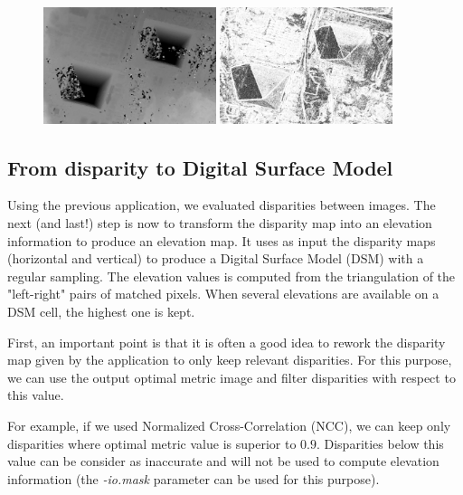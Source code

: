 \begin{figure}[!h]
  \center
  \includegraphics[width=0.45\textwidth]{../Art/MonteverdiImages/stereo_disparity_horizontal.png}
  \includegraphics[width=0.45\textwidth]{../Art/MonteverdiImages/stereo_disparity_metric.png}
  \label{fig:DisparityMetric}
\end{figure}

\subsection{From disparity to Digital Surface Model}

Using the previous application, we evaluated disparities between images. The
next (and last!) step is now to transform the disparity map into an elevation
information to produce an elevation map. It uses as input the disparity maps
(horizontal and vertical) to produce a Digital Surface Model (DSM) with a
regular sampling. The elevation values is computed from the triangulation of the
"left-right" pairs of matched pixels. When several elevations are available on
a DSM cell, the highest one is kept.

First, an important point is that it is often a good idea to rework
the disparity map given by the  application
to only keep relevant disparities. For this purpose, we can use the
output optimal metric image and filter disparities with respect to this
value.

For example, if we used Normalized Cross-Correlation (NCC), we can
keep only disparities where optimal metric value is superior to
$0.9$. Disparities below this value can be consider as inaccurate and
will not be used to compute elevation information
(the \textit{-io.mask} parameter can be used for this purpose).

